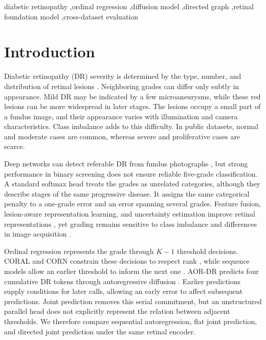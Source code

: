 \documentclass[a4paper,fleqn]{cas-sc}
\begin{document}
\begin{keywords}
diabetic retinopathy \sep ordinal regression \sep diffusion model \sep directed graph \sep retinal foundation model \sep cross-dataset evaluation
\end{keywords}

\maketitle

\section{Introduction}
\label{sec:introduction}

Diabetic retinopathy (DR) severity is determined by the type, number, and distribution of retinal lesions \citep{wilkinson2003}. Neighboring grades can differ only subtly in appearance. Mild DR may be indicated by a few microaneurysms, while these red lesions can be more widespread in later stages. The lesions occupy a small part of a fundus image, and their appearance varies with illumination and camera characteristics. Class imbalance adds to this difficulty. In public datasets, normal and moderate cases are common, whereas severe and proliferative cases are scarce.

Deep networks can detect referable DR from fundus photographs \citep{gulshan2016,ting2017}, but strong performance in binary screening does not ensure reliable five-grade classification. A standard softmax head treats the grades as unrelated categories, although they describe stages of the same progressive disease. It assigns the same categorical penalty to a one-grade error and an error spanning several grades. Feature fusion, lesion-aware representation learning, and uncertainty estimation improve retinal representations \citep{araujo2020drgraduate,sun2021lat,huang2025drctfn}, yet grading remains sensitive to class imbalance and differences in image acquisition \citep{men2025drstagenet,che2023gdrnet,wei2024caudr,chokuwa2025dg}.

Ordinal regression represents the grade through $K-1$ threshold decisions. CORAL and CORN constrain these decisions to respect rank \citep{cao2020coral,shi2023corn}, while sequence models allow an earlier threshold to inform the next one \citep{wang2023ord2seq}. AOR-DR predicts four cumulative DR tokens through autoregressive diffusion \citep{yu2025aordr}. Earlier predictions supply conditions for later calls, allowing an early error to affect subsequent predictions. Joint prediction removes this serial commitment, but an unstructured parallel head does not explicitly represent the relation between adjacent thresholds. We therefore compare sequential autoregression, flat joint prediction, and directed joint prediction under the same retinal encoder.
\end{document}
